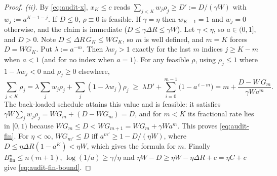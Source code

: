 \documentclass[11pt,a4paper]{article}
\begin{document}
\begin{proof}
\emph{(ii).} By \eqref{eq:audit-x}, $x_K\le c$ reads
$\sum_{j<K}w_j\rho_j\ge D':=D/(\gamma W)$ with $w_j:=a^{K-1-j}$. If $D\le0$,
$\rho\equiv0$ is feasible. If $\gamma=\eta$ then $w_{K-1}=1$ and $w_j=0$
otherwise, and the claim is immediate ($D\le\gamma\Delta R\le\gamma W$). Let
$\gamma<\eta$, so $a\in(0,1]$, and $D>0$. Note $D\le\Delta R\,G_K\le W G_K$, so
$m$ is well defined, and $m=K$ forces $D=WG_K$. Put $\lambda:=a^{-m}$. Then
$\lambda w_j>1$ exactly for the last $m$ indices $j\ge K-m$ when $a<1$ (and for
no index when $a=1$). For any feasible $\rho$, using $\rho_j\le1$ where
$1-\lambda w_j<0$ and $\rho_j\ge0$ elsewhere,
\[
 \sum_{j<K}\rho_j=\lambda\sum_j w_j\rho_j+\sum_j(1-\lambda w_j)\rho_j
 \;\ge\;\lambda D'+\sum_{i=0}^{m-1}\bigl(1-a^{\,i-m}\bigr)
 = m+\frac{D-W\,G_m}{\gamma W a^m}.
\]
The back-loaded schedule attains this value and is feasible: it satisfies
$\gamma W\sum_jw_j\rho_j=WG_m+(D-WG_m)=D$, and for $m<K$ its fractional rate lies
in $[0,1)$ because $WG_m\le D<WG_{m+1}=WG_m+\gamma Wa^m$. This proves
\eqref{eq:audit-fin}. For $\eta<\infty$, $WG_{m'}\le D$ iff
$a^{m'}\ge1-D/(\eta W)$, where $D\le\eta\Delta R(1-a^K)<\eta W$, which gives the
formula for $m$. Finally $B^\star_{\mathrm{fin}}\le n(m+1)$,
$\log(1/a)\ge\gamma/\eta$ and $\eta W-D\ge\eta W-\eta\Delta R+c=\eta C+c$ give
\eqref{eq:audit-fin-bound}.
\end{proof}
\end{document}
